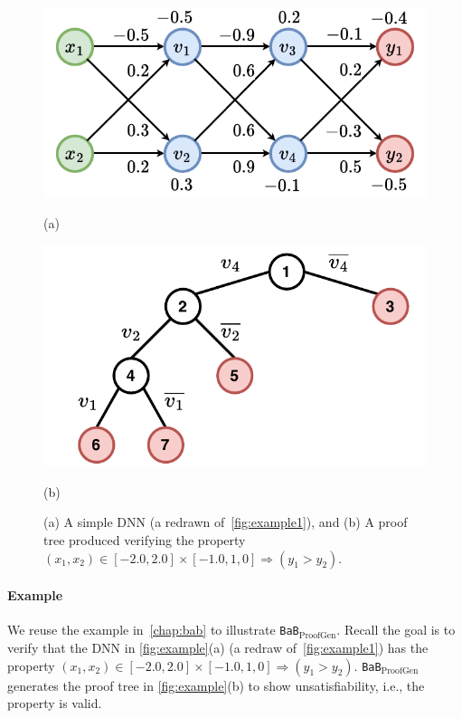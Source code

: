 \documentclass[oneside,11pt,dvipsnames]{book}
\numberwithin{equation}{section}
\theoremstyle{definition}
\theoremstyle{remark}
\newcommand{\proofgen}{\texttt{BaB$_{\text{ProofGen}}$}}
\newcommand{\neuralsat}{\texttt{NeuralSAT}}
\begin{document}
\begin{figure}[t]
    \begin{minipage}[b]{\linewidth}
        \centering
        \begin{minipage}[t]{0.48\textwidth}
            \centering  
            \includegraphics[width=\linewidth]{figure/proof_net.pdf}
            \caption*{(a)}
        \end{minipage}
        \begin{minipage}[t]{0.48\textwidth}
            \centering
            \includegraphics[width=\linewidth]{figure/proof_tree.pdf}
            \caption*{(b)}
        \end{minipage}
        \caption{(a) A simple DNN  (a redrawn of~\autoref{fig:example1}), and (b) A proof tree produced verifying the property $(x_1, x_2) \in [-2.0, 2.0] \times [-1.0, 1,0] \Rightarrow (y_1 > y_2)$.}
        \label{fig:example}
    \end{minipage}
\end{figure}

\paragraph{Example} We reuse the example in~\autoref{chap:bab} to illustrate \proofgen{}. Recall the goal is to verify that the DNN in \autoref{fig:example}(a) (a redraw of~\autoref{fig:example1}) has the property $(x_1, x_2) \in [-2.0, 2.0] \times [-1.0, 1,0] \Rightarrow (y_1 > y_2)$. \proofgen{} generates the proof tree in \autoref{fig:example}(b) to show unsatisfiability, i.e., the property is valid.
\end{document}
